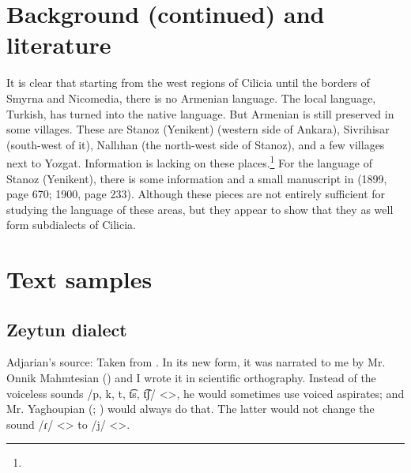\section{Background (continued) and literature}

It is clear that starting from the west regions of Cilicia until the borders of Smyrna and Nicomedia, there is no Armenian language. The local language, Turkish, has turned into the native language. But Armenian is still preserved in some villages. These are Stanoz (Yenikent) (western side of Ankara), Sivrihisar (south-west of it), Nallıhan (the north-west side of Stanoz), and a few villages next to Yozgat. Information is lacking on these places.\footnote{ } For the language of Stanoz (Yenikent), there is some information and a small manuscript in  (1899, page 670; 1900, page 233). Although these pieces are not entirely sufficient for studying the language of these areas, but they appear to show that they as well form subdialects of Cilicia. 


\begin{adjarianpage}\label{page:206}\end{adjarianpage}%

\section{Text samples}

{\sampleoverview}

\subsection{Zeytun dialect}

Adjarian's source: Taken from \citet[159]{Allahverdian-1884-UlniaZeytun}. In its new form, it was narrated to me by Mr. Onnik Mahmtesian () and I wrote it in scientific orthography. Instead of the voiceless sounds /p, k, t, t͡s, t͡ʃ/ <>, he would sometimes use voiced aspirates; and Mr. Yaghoupian (; ) would always do that. The latter would not change the sound /ɾ/ <> to /j/ <>. 


